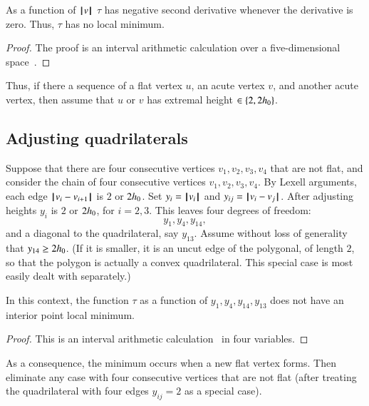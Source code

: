 \begin{lemma}
As a function of ${{\hskip0.1em|\hskip-0.15em|\hskip0.1em}v{\hskip0.1em|\hskip-0.15em|\hskip0.1em}}$
 $\tau$ has negative second derivative whenever the derivative is zero.  Thus, $\tau$ has no local minimum.
\end{lemma}

\begin{proof}
The proof is an interval arithmetic calculation over a five-dimensional space~\cite[cc:d2b]{hales:2009:nonlinear}. %
\end{proof}


Thus, if there a sequence of a flat vertex $u$, an acute vertex $v$, and another acute vertex, then  assume that $u$ or $v$ has extremal height $\in\{2,2{h_0}\}$.


\subsection{Adjusting quadrilaterals}

Suppose that there are four consecutive vertices $v_1,v_2,v_3,v_4$ that are not flat, and consider the chain of four consecutive vertices $v_1,v_2,v_3,v_4$. By Lexell arguments, each edge ${\hskip0.1em|\hskip-0.15em|\hskip0.1em}v_i - v_{i+1}{\hskip0.1em|\hskip-0.15em|\hskip0.1em}$ is $2$ or $2{h_0}$. Set $y_i = {{\hskip0.1em|\hskip-0.15em|\hskip0.1em}v_i{\hskip0.1em|\hskip-0.15em|\hskip0.1em}}$ and $y_{ij} = {\hskip0.1em|\hskip-0.15em|\hskip0.1em}v_i - v_j{\hskip0.1em|\hskip-0.15em|\hskip0.1em}$. After adjusting heights $y_i$ is $2$ or $2{h_0}$, for $i=2,3$. This leaves four degrees of freedom:
$$
y_1,y_4,y_{14},
$$
and a diagonal to the quadrilateral, say $y_{13}$. Assume without loss of generality that  $y_{14}\ge 2{h_0}$.  (If it is smaller, it is an uncut edge of the polygonal, of length $2$, so that the polygon is actually a convex quadrilateral.  This special case is most easily dealt with separately.)

\begin{lemma}
In this context, the function $\tau$ as a function of $y_1,y_4,y_{14},y_{13}$ does not have an interior point local minimum.
\end{lemma}

\begin{proof} This is an interval arithmetic calculation~\cite[cc:qua]{hales:2009:nonlinear} in four variables.%
\end{proof}

As a consequence, the minimum occurs when a new flat vertex forms.   Then eliminate any case with four consecutive vertices that are not flat (after treating the quadrilateral with four edges $y_{ij}=2$ as a special case).

